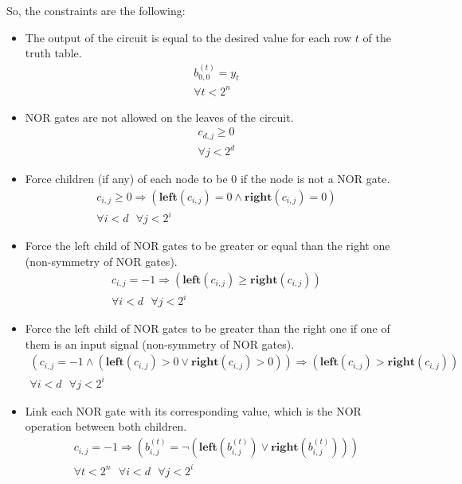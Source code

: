 \documentclass[letterpaper,10pt]{article}
\begin{document}
So, the constraints are the following:
\begin{itemize}
    \item The output of the circuit is equal to the desired value for each row $t$ of the truth table.
    \begin{align*}
        b_{0,0}^{(t)} = y_t \\
        \forall t < 2^n
    \end{align*}
    \item NOR gates are not allowed on the leaves of the circuit.
    \begin{align*}
        c_{d,j} \geq 0 \\
        \forall j < 2^d 
    \end{align*}
    \item Force children (if any) of each node to be 0 if the node is not a NOR gate.
    \begin{align*}
        c_{i,j} \geq 0 \Rightarrow (\mathbf{left}(c_{i,j}) = 0 \land \mathbf{right}(c_{i,j}) = 0) \\
        \forall i < d\text{ }\forall j < 2^i
    \end{align*}
    \item Force the left child of NOR gates to be greater or equal than the right one (non-symmetry of NOR gates).
    \begin{align*}
        c_{i,j} = -1 \Rightarrow (\mathbf{left}(c_{i,j}) \geq \mathbf{right}(c_{i,j})) \\
        \forall i < d\text{ }\forall j < 2^i
    \end{align*}
    \item Force the left child of NOR gates to be greater than the right one if one of them is an input signal (non-symmetry of NOR gates).
    \begin{align*}
        (c_{i,j} = -1 \land (\mathbf{left}(c_{i,j}) > 0 \lor \mathbf{right}(c_{i,j}) > 0)) \Rightarrow (\mathbf{left}(c_{i,j}) > \mathbf{right}(c_{i,j})) \\
        \forall i < d\text{ }\forall j < 2^i
    \end{align*}
    \item Link each NOR gate with its corresponding value, which is the NOR operation between both children.
    \begin{align*}
        c_{i,j} = -1 \Rightarrow (b_{i,j}^{(t)} = \lnot (\mathbf{left}(b_{i,j}^{(t)}) \lor \mathbf{right}(b_{i,j}^{(t)}))) \\
        \forall t < 2^n\text{ }\forall i < d\text{ }\forall j < 2^i

\end{align*}
\end{itemize}
\end{document}
